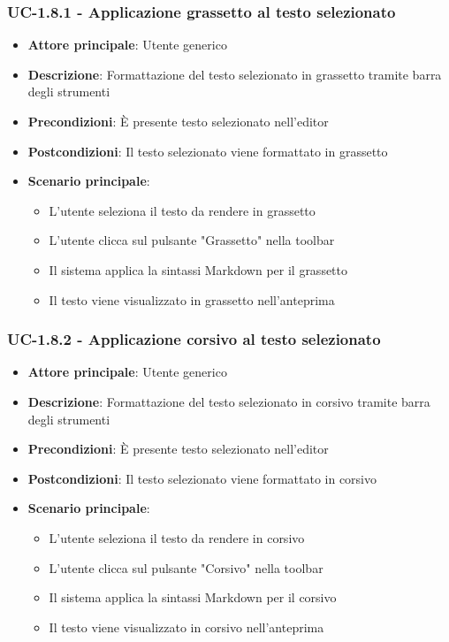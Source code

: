 \documentclass[11pt,a4paper]{article}
\begin{document}
\subsubsection{UC-1.8.1 - Applicazione grassetto al testo selezionato}
\begin{itemize}
    \item \textbf{Attore principale}: Utente generico
    \item \textbf{Descrizione}: Formattazione del testo selezionato in grassetto tramite barra degli strumenti
    \item \textbf{Precondizioni}: È presente testo selezionato nell'editor
    \item \textbf{Postcondizioni}: Il testo selezionato viene formattato in grassetto
    \item \textbf{Scenario principale}:
        \begin{itemize}
            \item L'utente seleziona il testo da rendere in grassetto
            \item L'utente clicca sul pulsante "Grassetto" nella toolbar
            \item Il sistema applica la sintassi Markdown per il grassetto
            \item Il testo viene visualizzato in grassetto nell'anteprima
        \end{itemize}
\end{itemize}

\subsubsection{UC-1.8.2 - Applicazione corsivo al testo selezionato}
\begin{itemize}
    \item \textbf{Attore principale}: Utente generico
    \item \textbf{Descrizione}: Formattazione del testo selezionato in corsivo tramite barra degli strumenti
    \item \textbf{Precondizioni}: È presente testo selezionato nell'editor
    \item \textbf{Postcondizioni}: Il testo selezionato viene formattato in corsivo
    \item \textbf{Scenario principale}:
        \begin{itemize}
            \item L'utente seleziona il testo da rendere in corsivo
            \item L'utente clicca sul pulsante "Corsivo" nella toolbar
            \item Il sistema applica la sintassi Markdown per il corsivo
            \item Il testo viene visualizzato in corsivo nell'anteprima
        \end{itemize}
\end{itemize}
\end{document}
